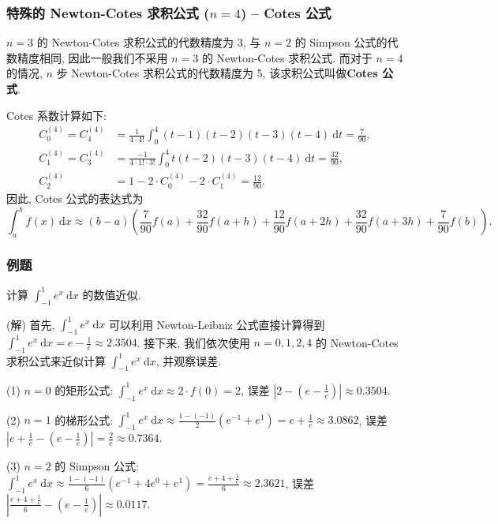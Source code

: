 
\begin{frame}
\frametitle{特殊的 Newton-Cotes 求积公式 ($n = 4$) -- Cotes 公式}

$n = 3$ 的 Newton-Cotes 求积公式的代数精度为 3, 与 $n = 2$ 的 Simpson 公式的代数精度相同, 因此一般我们不采用 $n = 3$ 的 Newton-Cotes 求积公式. 而对于 $n = 4$ 的情况, $n$ 步 Newton-Cotes 求积公式的代数精度为 5, 该求积公式叫做\textbf{Cotes 公式}.

\pause
\vspace{0.5em}

Cotes 系数计算如下:
\begin{align*}
C_0^{(4)} = C_4^{(4)} & = \frac{1}{4 \cdot 4!} \int_0^4 (t-1)(t-2)(t-3)(t-4) ~ \mathrm{d}t = \frac{7}{90}, \\
C_1^{(4)} = C_3^{(4)} & = \frac{-1}{4 \cdot 1! \cdot 3!} \int_0^4 t(t-2)(t-3)(t-4) ~ \mathrm{d}t = \frac{32}{90}, \\
C_2^{(4)} & = 1 - 2 \cdot C_0^{(4)} - 2 \cdot C_1^{(4)}= \frac{12}{90}.
\end{align*}
因此, Cotes 公式的表达式为
\[
\int_a^b f(x) ~ \mathrm{d}x \approx (b-a) \left( \frac{7}{90} f(a) + \frac{32}{90} f(a + h) + \frac{12}{90} f(a + 2h) + \frac{32}{90} f(a + 3h) + \frac{7}{90} f(b) \right).
\]

\end{frame}


\begin{frame}
\frametitle{例题}

\begin{eg}
计算 $\int_{-1}^1 e^x ~ \mathrm{d}x$ 的数值近似.
\end{eg}

\pause

\startproof[bg=yellow, fg=red](解)
首先, $\int_{-1}^1 e^x ~ \mathrm{d}x$ 可以利用 Newton-Leibniz 公式直接计算得到 $\int_{-1}^1 e^x ~ \mathrm{d}x = e - \frac{1}{e} \approx 2.3504$. 接下来, 我们依次使用 $n = 0, 1, 2, 4$ 的 Newton-Cotes 求积公式来近似计算 $\int_{-1}^1 e^x ~ \mathrm{d}x$, 并观察误差.

\pause
\vspace{0.5em}
(1) $n = 0$ 的矩形公式: $\int_{-1}^1 e^x ~ \mathrm{d}x \approx 2 \cdot f(0) = 2$, 误差 $\left|2 - (e - \frac{1}{e})\right| \approx 0.3504$.

\pause

(2) $n = 1$ 的梯形公式: $\int_{-1}^1 e^x ~ \mathrm{d}x \approx \frac{1 - (-1)}{2} (e^{-1} + e^1) = e + \frac{1}{e} \approx 3.0862$, 误差 $\left|e + \frac{1}{e} - (e - \frac{1}{e})\right| = \frac{2}{e} \approx 0.7364$.

\pause

(3) $n = 2$ 的 Simpson 公式: $\int_{-1}^1 e^x ~ \mathrm{d}x \approx \frac{1 - (-1)}{6} (e^{-1} + 4 e^0 + e^1) = \frac{e + 4 + \frac{1}{e}}{6} \approx 2.3621$, 误差 $\left|\frac{e + 4 + \frac{1}{e}}{6} - (e - \frac{1}{e})\right| \approx 0.0117$.

\end{frame}

